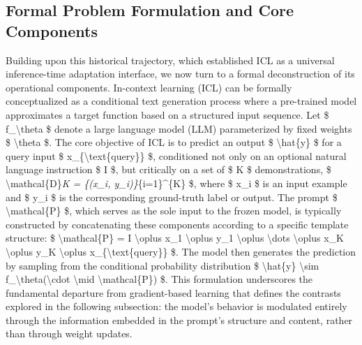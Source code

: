 \documentclass[11pt]{article}
\begin{document}
\subsection{Formal Problem Formulation and Core Components}

Building upon this historical trajectory, which established ICL as a universal inference-time adaptation interface, we now turn to a formal deconstruction of its operational components. In-context learning (ICL) can be formally conceptualized as a conditional text generation process where a pre-trained model approximates a target function based on a structured input sequence. Let \$ f\_\textbackslash theta \$ denote a large language model (LLM) parameterized by fixed weights \$ \textbackslash theta \$. The core objective of ICL is to predict an output \$ \textbackslash hat\{y\} \$ for a query input \$ x\_\{\textbackslash text\{query\}\} \$, conditioned not only on an optional natural language instruction \$ I \$, but critically on a set of \$ K \$ demonstrations, \$ \textbackslash mathcal\{D\}\emph{K = \{(x\_i, y\_i)\}}\{i=1\}\^{}\{K\} \$, where \$ x\_i \$ is an input example and \$ y\_i \$ is the corresponding ground-truth label or output. The prompt \$ \textbackslash mathcal\{P\} \$, which serves as the sole input to the frozen model, is typically constructed by concatenating these components according to a specific template structure: \$ \textbackslash mathcal\{P\} = I \textbackslash oplus x\_1 \textbackslash oplus y\_1 \textbackslash oplus \textbackslash dots \textbackslash oplus x\_K \textbackslash oplus y\_K \textbackslash oplus x\_\{\textbackslash text\{query\}\} \$. The model then generates the prediction by sampling from the conditional probability distribution \$ \textbackslash hat\{y\} \textbackslash sim f\_\textbackslash theta(\textbackslash cdot \textbackslash mid \textbackslash mathcal\{P\}) \$. This formulation underscores the fundamental departure from gradient-based learning that defines the contrasts explored in the following subsection: the model's behavior is modulated entirely through the information embedded in the prompt's structure and content, rather than through weight updates.
\end{document}
